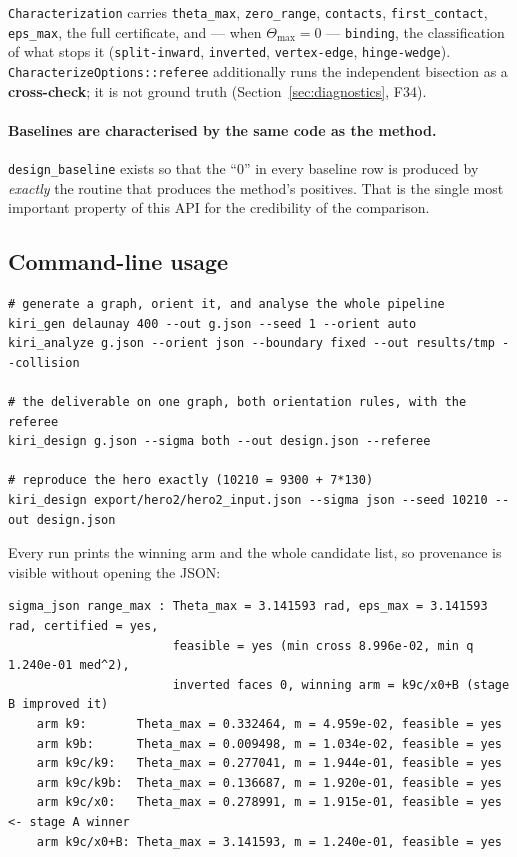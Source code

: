 \documentclass[11pt,a4paper]{article}
\theoremstyle{definition}
\newcommand{\Tmax}{\Theta_{\max}}
\newcommand{\file}[1]{\texttt{\small #1}}
\begin{document}
\noindent \texttt{Characterization} carries \texttt{theta\_max}, \texttt{zero\_range},
\texttt{contacts}, \texttt{first\_contact}, \texttt{eps\_max}, the full certificate, and ---
when $\Tmax=0$ --- \texttt{binding}, the classification of what stops it
(\texttt{split-inward}, \texttt{inverted}, \texttt{vertex-edge}, \texttt{hinge-wedge}).
\texttt{CharacterizeOptions::referee} additionally runs the independent bisection as a
\textbf{cross-check}; it is not ground truth (Section~\ref{sec:diagnostics}, F34).

\paragraph{Baselines are characterised by the same code as the method.} \file{design\_baseline}
exists so that the ``0'' in every baseline row is produced by \emph{exactly} the routine that
produces the method's positives. That is the single most important property of this API for
the credibility of the comparison.

\subsection{Command-line usage}

\begin{verbatim}
# generate a graph, orient it, and analyse the whole pipeline
kiri_gen delaunay 400 --out g.json --seed 1 --orient auto
kiri_analyze g.json --orient json --boundary fixed --out results/tmp --collision

# the deliverable on one graph, both orientation rules, with the referee
kiri_design g.json --sigma both --out design.json --referee

# reproduce the hero exactly (10210 = 9300 + 7*130)
kiri_design export/hero2/hero2_input.json --sigma json --seed 10210 --out design.json
\end{verbatim}

\noindent Every run prints the winning arm and the whole candidate list, so provenance is
visible without opening the JSON:

\begin{verbatim}
sigma_json range_max : Theta_max = 3.141593 rad, eps_max = 3.141593 rad, certified = yes,
                       feasible = yes (min cross 8.996e-02, min q 1.240e-01 med^2),
                       inverted faces 0, winning arm = k9c/x0+B (stage B improved it)
    arm k9:       Theta_max = 0.332464, m = 4.959e-02, feasible = yes
    arm k9b:      Theta_max = 0.009498, m = 1.034e-02, feasible = yes
    arm k9c/k9:   Theta_max = 0.277041, m = 1.944e-01, feasible = yes
    arm k9c/k9b:  Theta_max = 0.136687, m = 1.920e-01, feasible = yes
    arm k9c/x0:   Theta_max = 0.278991, m = 1.915e-01, feasible = yes   <- stage A winner
    arm k9c/x0+B: Theta_max = 3.141593, m = 1.240e-01, feasible = yes
\end{verbatim}
\end{document}
